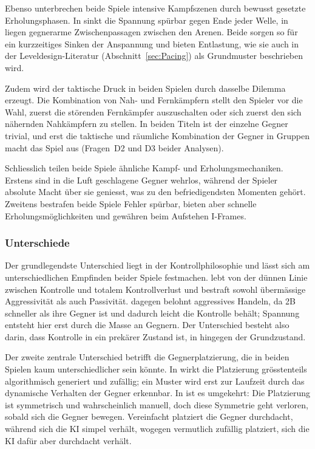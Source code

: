 \documentclass[../Main.tex]{subfiles}
\begin{document}
Ebenso unterbrechen beide Spiele intensive Kampfszenen durch bewusst gesetzte Erholungsphasen. In  sinkt die Spannung spürbar gegen Ende jeder Welle, in  liegen gegnerarme Zwischenpassagen zwischen den Arenen. Beide sorgen so für ein kurzzeitiges Sinken der Anspannung und bieten Entlastung, wie sie auch in der Leveldesign-Literatur (Abschnitt~\ref{sec:Pacing}) als Grundmuster beschrieben wird.

Zudem wird der taktische Druck in beiden Spielen durch dasselbe Dilemma erzeugt. Die Kombination von Nah- und Fernkämpfern stellt den Spieler vor die Wahl, zuerst die störenden Fernkämpfer auszuschalten oder sich zuerst den sich nähernden Nahkämpfern zu stellen. In beiden Titeln ist der einzelne Gegner trivial, und erst die taktische und räumliche Kombination der Gegner in Gruppen macht das Spiel aus (Fragen~D2 und D3 beider Analysen).

Schliesslich teilen beide Spiele ähnliche Kampf- und Erholungsmechaniken. Erstens sind in die Luft geschlagene Gegner wehrlos, während der Spieler absolute Macht über sie geniesst, was zu den befriedigendsten Momenten gehört. Zweitens bestrafen beide Spiele Fehler spürbar, bieten aber schnelle Erholungsmöglichkeiten und gewähren beim Aufstehen I-Frames.

\subsubsection{Unterschiede}

Der grundlegendste Unterschied liegt in der Kontrollphilosophie und lässt sich am unterschiedlichen Empfinden beider Spiele festmachen.  lebt von der dünnen Linie zwischen Kontrolle und totalem Kontrollverlust und bestraft sowohl übermässige Aggressivität als auch Passivität.  dagegen belohnt aggressives Handeln, da 2B schneller als ihre Gegner ist und dadurch leicht die Kontrolle behält; Spannung entsteht hier erst durch die Masse an Gegnern. Der Unterschied besteht also darin, dass Kontrolle in  ein prekärer Zustand ist, in  hingegen der Grundzustand.

Der zweite zentrale Unterschied betrifft die Gegnerplatzierung, die in beiden Spielen kaum unterschiedlicher sein könnte. In  wirkt die Platzierung grösstenteils algorithmisch generiert und zufällig; ein Muster wird erst zur Laufzeit durch das dynamische Verhalten der Gegner erkennbar. In  ist es umgekehrt: Die Platzierung ist symmetrisch und wahrscheinlich manuell, doch diese Symmetrie geht verloren, sobald sich die Gegner bewegen. Vereinfacht platziert  die Gegner durchdacht, während sich die KI simpel verhält, wogegen  vermutlich zufällig platziert, sich die KI dafür aber durchdacht verhält.
\end{document}
